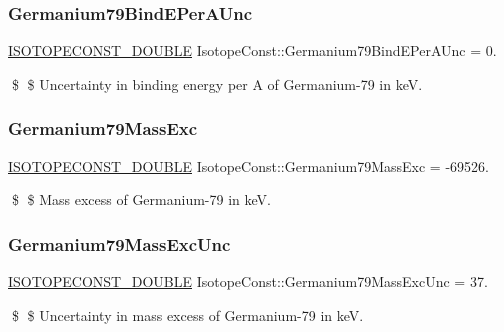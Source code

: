 \subsubsection{\texorpdfstring{Germanium79\+Bind\+E\+Per\+A\+Unc}{Germanium79BindEPerAUnc}}
{\footnotesize\ttfamily \mbox{\hyperlink{group___isotope_const-_macros_ga8f45a7272ce02c0b4c65c44636ed719a}{I\+S\+O\+T\+O\+P\+E\+C\+O\+N\+S\+T\+\_\+\+D\+O\+U\+B\+LE}} Isotope\+Const\+::\+Germanium79\+Bind\+E\+Per\+A\+Unc = 0.}

\$ \$ Uncertainty in binding energy per A of Germanium-\/79 in keV. \mbox{\label{group___isotope_const-_germanium-_ge79_ga2dae3cb03ef908460109fd726fbd8b6c}} 
\subsubsection{\texorpdfstring{Germanium79\+Mass\+Exc}{Germanium79MassExc}}
{\footnotesize\ttfamily \mbox{\hyperlink{group___isotope_const-_macros_ga8f45a7272ce02c0b4c65c44636ed719a}{I\+S\+O\+T\+O\+P\+E\+C\+O\+N\+S\+T\+\_\+\+D\+O\+U\+B\+LE}} Isotope\+Const\+::\+Germanium79\+Mass\+Exc = -\/69526.}

\$ \$ Mass excess of Germanium-\/79 in keV. \mbox{\label{group___isotope_const-_germanium-_ge79_ga703b55261e470bbcdedafd44f7f3cd37}} 
\subsubsection{\texorpdfstring{Germanium79\+Mass\+Exc\+Unc}{Germanium79MassExcUnc}}
{\footnotesize\ttfamily \mbox{\hyperlink{group___isotope_const-_macros_ga8f45a7272ce02c0b4c65c44636ed719a}{I\+S\+O\+T\+O\+P\+E\+C\+O\+N\+S\+T\+\_\+\+D\+O\+U\+B\+LE}} Isotope\+Const\+::\+Germanium79\+Mass\+Exc\+Unc = 37.}

\$ \$ Uncertainty in mass excess of Germanium-\/79 in keV. \mbox{\label{group___isotope_const-_germanium-_ge79_ga22b8e7d8656b031c78de29cc0c156f22}} 
